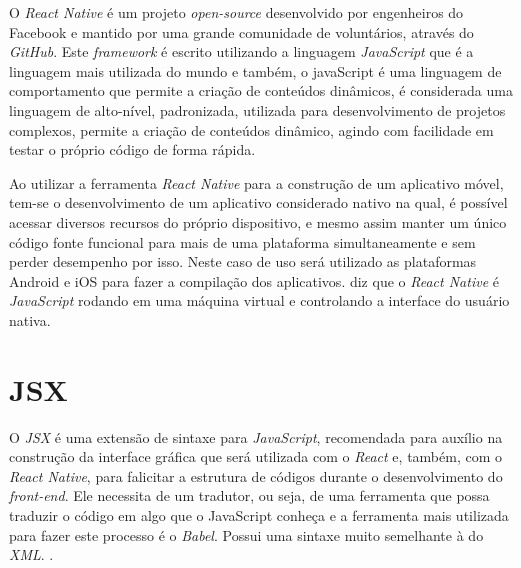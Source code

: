 O \textit{React Native} é um projeto \textit{open-source} desenvolvido por engenheiros do Facebook e mantido por uma grande comunidade de voluntários, através do \textit{GitHub}. Este \textit{framework} é escrito utilizando a linguagem \textit{JavaScript} que é a linguagem mais utilizada do mundo e também, o javaScript é uma linguagem de comportamento que permite a criação de conteúdos dinâmicos, é considerada uma linguagem de alto-nível, padronizada, utilizada para desenvolvimento de projetos complexos, permite a criação de conteúdos dinâmico, agindo com facilidade em testar o próprio código de forma rápida. \cite{javascript}

Ao utilizar a ferramenta \textit{React Native} para a construção de um aplicativo móvel, tem-se o desenvolvimento de um aplicativo considerado nativo na qual, é possível acessar diversos recursos do próprio dispositivo, e mesmo assim manter um único código fonte funcional para mais de uma plataforma simultaneamente e sem perder desempenho por isso. Neste caso de uso será utilizado as plataformas Android e iOS para fazer a compilação dos aplicativos.
 diz que o \textit{React Native} é \textit{JavaScript} rodando em uma máquina virtual e controlando a interface do usuário nativa.



\section{JSX}
O \textit{JSX} é uma extensão de sintaxe para \textit{JavaScript}, recomendada para auxílio na construção da interface gráfica que será utilizada com o \textit{React} e, também, com o \textit{React Native}, para falicitar a estrutura de códigos durante o desenvolvimento do \textit{front-end}. Ele necessita de um tradutor, ou seja, de uma ferramenta que possa traduzir o código em algo que o JavaScript conheça e a ferramenta mais utilizada para fazer este processo é o \textit{Babel}. Possui uma sintaxe muito semelhante à do \textit{XML}.  
\cite{jsx}.


